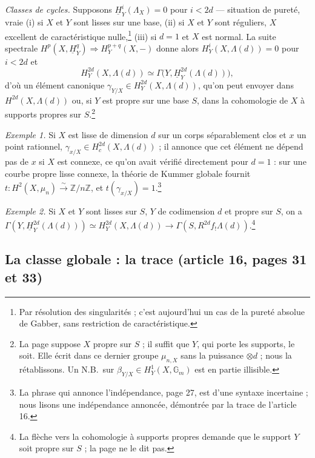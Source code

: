\documentclass[11pt,a4paper]{article}
\begin{document}
\emph{Classes de cycles.} Supposons $\underline{H}^{i}_{Y}(\Lambda_{X}) = 0$ pour
$i < 2d$ --- situation de pureté, vraie (i) si $X$ et $Y$ sont lisses sur une
base, (ii) si $X$ et $Y$ sont réguliers, $X$ excellent de caractéristique
nulle,\footnote{Par résolution des singularités ; c'est aujourd'hui un cas de
la pureté absolue de Gabber, sans restriction de caractéristique.} (iii) si
$d = 1$ et $X$ est normal. La suite spectrale $H^{p}(X,
\underline{H}^{q}_{Y}) \Rightarrow H^{p+q}_{Y}(X, -)$ donne alors
$H^{i}_{Y}(X, \Lambda(d)) = 0$ pour $i < 2d$ et
\[
  H^{2d}_{Y}(X, \Lambda(d)) \simeq \Gamma\bigl(Y,
  \underline{H}^{2d}_{Y}(\Lambda(d))\bigr),
\]
d'où un élément canonique $\gamma_{Y/X} \in H^{2d}_{Y}(X, \Lambda(d))$, qu'on
peut envoyer dans $H^{2d}(X, \Lambda(d))$ ou, si $Y$ est propre sur une base
$S$, dans la cohomologie de $X$ à supports propres sur
$S$.\footnote{La page suppose $X$ propre sur $S$ ; il suffit que $Y$, qui
porte les supports, le soit. Elle écrit dans ce dernier groupe $\mu_{n,X}$ sans la
puissance $\otimes d$ ; nous la rétablissons. Un N.B.\ sur
$\beta_{Y/X} \in H^{1}_{Y}(X, \mathbb{G}_{m})$ est en partie illisible.}

\emph{Exemple 1.} Si $X$ est lisse de dimension $d$ sur un corps séparablement
clos et $x$ un point rationnel, $\gamma_{x/X} \in H^{2d}_{c}(X, \Lambda(d))$ ; il
annonce que cet élément ne dépend pas de $x$ si $X$ est connexe, ce qu'on
avait vérifié directement pour $d=1$ : sur une courbe propre lisse connexe, la
théorie de Kummer globale fournit $t : H^{2}(X, \mu_{n}) \xrightarrow{\sim}
\mathbb{Z}/n\mathbb{Z}$, et $t(\gamma_{x/X}) = 1$.\footnote{La phrase qui
annonce l'indépendance, page 27, est d'une syntaxe incertaine ; nous lisons
une indépendance annoncée, démontrée par la trace de l'article 16.}

\emph{Exemple 2.} Si $X$ et $Y$ sont lisses sur $S$, $Y$ de codimension $d$ et
propre sur $S$, on a $\Gamma(Y, \underline{H}^{2d}_{Y}(\Lambda(d))) \simeq
H^{2d}_{Y}(X, \Lambda(d)) \to \Gamma(S, R^{2d}f_{!}\Lambda(d))$.\footnote{La
flèche vers la cohomologie à supports propres demande que le support $Y$ soit
propre sur $S$ ; la page ne le dit pas.}

\subsection*{La classe globale : la trace (article 16, pages 31 et 33)}
\end{document}
